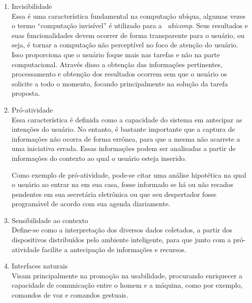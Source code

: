 		\begin{enumerate}
		
			\item Invisibilidade \\
			
				Essa é uma característica fundamental na computação ubíqua, algumas vezes o termo ``computação
				invisível'' é utilizado para a ~\textit{ubicomp}. Seus resultados e suas funcionalidades devem
				ocorrer de forma transparente para o usuário, ou seja, é tornar a computação não perceptível no
				foco de atenção do usuário. Isso proporciona que o usuário foque mais nas tarefas e não na parte
				computacional. Através disso a obtenção das informações pertinentes, processamento e obtenção dos
				resultados ocorrem sem que o usuário os solicite a todo o momento, focando principalmente na
				solução da tarefa proposta. \\
			
	
			\item Pró-atividade \\
			
				Essa característica é definida como a capacidade do sistema em antecipar as intenções do
				usuário. No entanto, é bastante importante que a captura de informações não ocorra de forma
				errônea, para que a mesma não acarrete a uma iniciativa errada. Essas informações podem ser
				analisadas a partir de informações do contexto ao qual o usuário esteja inserido.
				
				Como exemplo de pró-atividade, pode-se citar uma análise hipotética na qual o usuário ao entrar
				na em sua casa, fosse informado se há ou não recados pendentes em sua secretária eletrônica ou
				que seu despertador fosse programável de acordo com sua agenda diariamente. \\
				
			\item Sensibilidade ao contexto \\
			
				Define-se como a interpretação dos diversos dados coletados, a partir dos dispositivos
				distribuídos pelo ambiente inteligente, para que junto com a pró-atividade facilite a antecipação
				de informações e recursos. \\
	
			\item Interfaces naturais \\
		
				Visam principalmente na promoção na usabilidade, procurando enriquecer a capacidade de
				comunicação entre o homem e a máquina, como por exemplo, comandos de voz e comandos gestuais.
				
			
		\end{enumerate} 